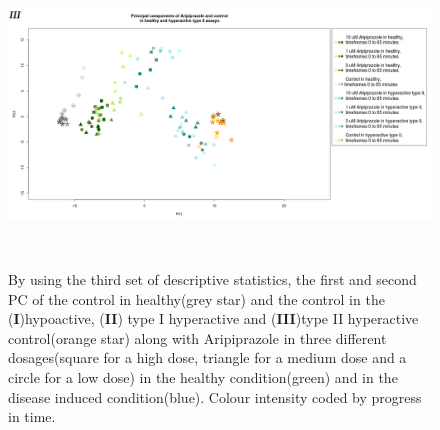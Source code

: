 \documentclass[a4paper,12pt]{article}
\begin{document}
\newpage
\begin{figure}[h!]
\begin{center}
\includegraphics[width=16cm,height=8cm]{Aripiprazole_Control_DarkPTZ_stratified.png}
\caption{By using the third set of descriptive statistics, the first and second PC of the control in healthy(grey star) and the control in the (\textbf{I})hypoactive, (\textbf{II}) type I hyperactive and (\textbf{III})type II hyperactive control(orange star) along with Aripiprazole in three different dosages(square for a high dose, triangle for a medium dose and a circle for a low dose) in the healthy condition(green) and in the disease induced condition(blue). Colour intensity coded by progress in time.}
\end{center}
\end{figure}
\newpage
\end{document}
